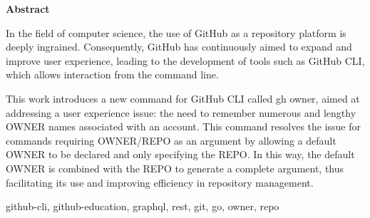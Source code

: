 \documentclass[spanish,a4paper,12pt,oneside]{extreport}
\newenvironment{summary}
{\par\noindent\begin{center}\textbf{Abstract}\end{center}\begin{itshape}\par\noindent}
{\end{itshape}}
\newenvironment{keywords}
{\begin{list}{}{\setlength{\leftmargin}{1em}}\item[\hskip\labelsep \bfseries Keywords:]}
{\end{list}}
\begin{document}
\begin{summary}
  In the field of computer science, the use of GitHub as a repository platform is deeply ingrained.
  Consequently, GitHub has continuously aimed to expand and improve user experience,
  leading to the development of tools such as GitHub CLI, which allows interaction from the command line.

  This work introduces a new command for GitHub CLI called gh owner, aimed at addressing a user experience issue:
  the need to remember numerous and lengthy OWNER names associated with an account.
  This command resolves the issue for commands requiring OWNER/REPO as an argument by allowing a default OWNER
  to be declared and only specifying the REPO. In this way, the default OWNER is combined with the REPO to generate a complete argument,
  thus facilitating its use and improving efficiency in repository management.
  \begin{keywords}
    github-cli, github-education, graphql, rest, git, go, owner, repo
  \end{keywords}

\end{summary}

\newpage{\pagestyle{empty}}
\thispagestyle{empty}

\pagestyle{myheadings} %



\renewcommand{\thepage}{\roman{page}}
\setcounter{page}{1}
\pagestyle{plain}


{\hypersetup{linkcolor=black}
  \tableofcontents

  \newpage{\pagestyle{empty}}

  \listoffigures

  \newpage{\pagestyle{empty}}

  \listoftables
}
\end{document}
